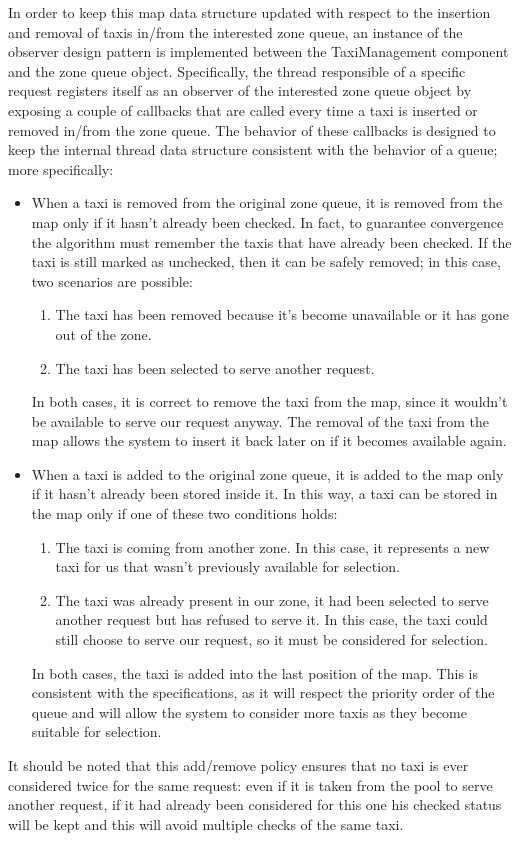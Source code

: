 In order to keep this map data structure updated with respect to the insertion and removal of taxis in/from the interested zone queue, an instance of the observer design pattern is implemented between the TaxiManagement component and the zone queue object. Specifically, the thread responsible of a specific request registers itself as an observer of the interested zone queue object by exposing a couple of callbacks that are called every time a taxi is inserted or removed in/from the zone queue. The behavior of these callbacks is designed to keep the internal thread data structure consistent with the behavior of a queue; more specifically:
\begin{itemize}
	\item When a taxi is removed from the original zone queue, it is removed from the map only if it hasn't already been checked. In fact, to guarantee convergence the algorithm must remember the taxis that have already been checked. If the taxi is still marked as unchecked, then it can be safely removed; in this case, two scenarios are possible:
	\begin{enumerate}
	\item The taxi has been removed because it's become unavailable or it has gone out of the zone. 
	\item The taxi has been selected to serve another request.	
	\end{enumerate}
	In both cases, it is correct to remove the taxi from the map, since it wouldn't be available to serve our request anyway. The removal of the taxi from the map allows the system to insert it back later on if it becomes available again.
	\item When a taxi is added to the original zone queue, it is added to the map only if it hasn't already been stored inside it. In this way, a taxi can be stored in the map only if one of these two conditions holds:
	\begin{enumerate}
		\item The taxi is coming from another zone. In this case, it represents a new taxi for us that wasn't previously available for selection. 
		\item The taxi was already present in our zone, it had been selected to serve another request but has refused to serve it. In this case, the taxi could still choose to serve our request, so it must be considered for selection. 
	\end{enumerate}
	In both cases, the taxi is added into the last position of the map. This is consistent with the specifications, as it will respect the priority order of the queue and will allow the system to consider more taxis as they become suitable for selection. 
\end{itemize}
It should be noted that this add/remove policy ensures that no taxi is ever considered twice for the same request: even if it is taken from the pool to serve another request, if it had already been considered for this one his checked status will be kept and this will avoid multiple checks of the same taxi.

